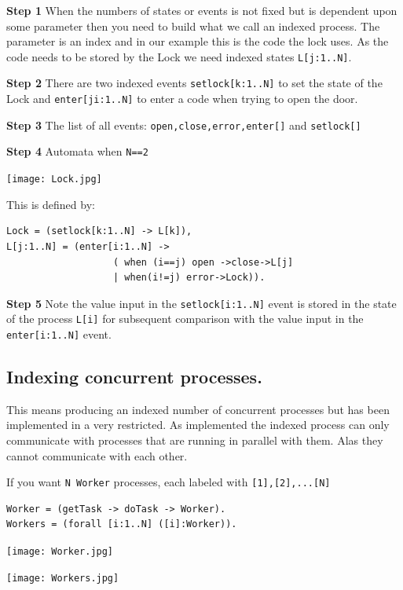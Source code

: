 \documentclass[]{article}
\begin{document}
{\bf Step 1} When the numbers of states or events is not fixed but is dependent upon some parameter then you need to build what we call an indexed  process. The parameter is an index and in our example this is the {\sf code} the lock uses. As the code needs to be stored by the Lock we need indexed states \verb|L[j:1..N]|.

{\bf Step 2} There are two indexed events \verb|setlock[k:1..N]| to set the state of the Lock and \verb|enter[ji:1..N]| to enter a code when trying to open the door.

{\bf Step 3} The list of all events: \verb|open,close,error,enter[]| and \verb|setlock[]|

{\bf Step 4} Automata when \verb|N==2|

\noindent\begin{center} \texttt{[image: Lock.jpg]} \end{center}

This is defined by:

\hspace{1in}\begin{minipage}{0.3\textwidth}
\begin{verbatim}
Lock = (setlock[k:1..N] -> L[k]),
L[j:1..N] = (enter[i:1..N] ->
                   ( when (i==j) open ->close->L[j]
                   | when(i!=j) error->Lock)).   \end{verbatim}
\end{minipage}


{\bf Step 5} Note the value input in the \verb$setlock[i:1..N]$ event is stored in the state of the process \verb$L[i]$ for subsequent comparison with the value input in the \verb$enter[i:1..N]$ event.



  \subsection{Indexing concurrent processes.}
  This means producing an indexed number of concurrent processes but has been implemented in a very restricted. As implemented the indexed process can only communicate with processes that are running in parallel with them. Alas they cannot communicate with each other.


  If you want \verb$N Worker$ processes, each  labeled with \verb$[1],[2],...[N]$

 \begin{center}\begin{minipage}{0.55\textwidth}
\begin{verbatim}
Worker = (getTask -> doTask -> Worker).
Workers = (forall [i:1..N] ([i]:Worker)).
   \end{verbatim}
\end{minipage}\begin{minipage}{0.4\textwidth}
\begin{center}\texttt{[image: Worker.jpg]}\end{center}
\end{minipage}

\texttt{[image: Workers.jpg]}
\end{center}
\end{document}
